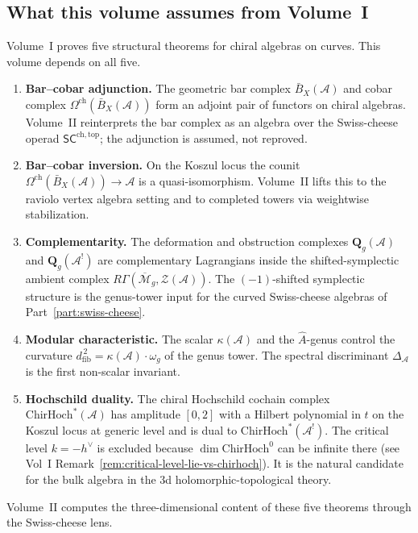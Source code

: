 \documentclass[11pt]{memoir}
\newcommand{\cA}{\mathcal{A}}
\newcommand{\barB}{\bar{B}}
\newcommand{\Omegach}{\Omega^{\mathrm{ch}}}
\newcommand{\dfib}{d_{\mathrm{fib}}}
\begin{document}
\subsection*{What this volume assumes from Volume~I}

Volume~I proves five structural theorems for chiral algebras on
curves. This volume depends on all five.

\begin{enumerate}[label=\textbf{(\Alph*)},leftmargin=2.2em]
\item \textbf{Bar--cobar adjunction.}
 The geometric bar complex $\barB_X(\cA)$ and cobar complex
 $\Omegach(\barB_X(\cA))$ form an adjoint pair of functors on
 chiral algebras. Volume~II reinterprets the bar complex as an
 algebra over the Swiss-cheese operad
 $\mathsf{SC}^{\mathrm{ch,top}}$; the adjunction is assumed, not
 reproved.
\item \textbf{Bar--cobar inversion.}
 On the Koszul locus the counit
 $\Omegach(\barB_X(\cA))\to \cA$ is a quasi-isomorphism.
 Volume~II lifts this to the raviolo vertex algebra setting and to
 completed towers via weightwise stabilization.
\item \textbf{Complementarity.}
 The deformation and obstruction complexes $\mathbf Q_g(\cA)$ and
 $\mathbf Q_g(\cA^!)$ are complementary Lagrangians inside the
 shifted-symplectic ambient complex
 $R\Gamma(\overline{\mathcal M}_g,\mathcal Z(\cA))$. The
 $(-1)$-shifted symplectic structure is the genus-tower input for
 the curved Swiss-cheese algebras of Part~\ref{part:swiss-cheese}.
\item \textbf{Modular characteristic.}
 The scalar $\kappa(\cA)$ and the $\hat A$-genus control the
 curvature $\dfib^{\,2}=\kappa(\cA)\cdot\omega_g$ of the genus
 tower. The spectral discriminant $\Delta_\cA$ is the first
 non-scalar invariant.
\item \textbf{Hochschild duality.}
 The chiral Hochschild cochain complex
 $\mathrm{ChirHoch}^*(\cA)$ has amplitude $[0,2]$ with a Hilbert
 polynomial in $t$ on the Koszul locus at generic level and is dual
 to $\mathrm{ChirHoch}^*(\cA^!)$. The critical
 level $k = -h^\vee$ is excluded because $\dim \mathrm{ChirHoch}^0$ can
 be infinite there (see Vol~I Remark~\ref*{rem:critical-level-lie-vs-chirhoch}).
 It is the natural candidate for the bulk algebra in the $3$d
 holomorphic-topological theory.
\end{enumerate}
Volume~II computes the three-dimensional content of these five
theorems through the Swiss-cheese lens.
\end{document}

